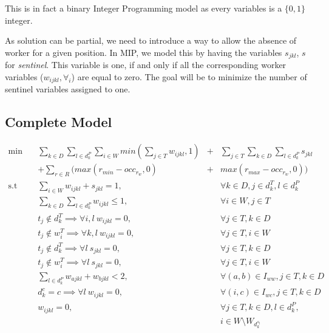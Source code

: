 \documentclass[../../thesis.tex]{subfiles}
\begin{document}
This is in fact a binary Integer Programming model as every variables is a $\{0, 1\}$ integer.

As solution can be partial, we need to introduce a way to allow the absence of worker for a 
given position. In MIP, we model this by having the variables $s_{jkl}$, $s$ for \emph{sentinel}. This variable is one, if and only if all the 
corresponding worker variables ($w_{ijkl}, \forall_i$) are equal to zero. The goal will be to minimize 
the number of sentinel variables assigned to one.

\subsection{Complete Model}

\begingroup
\allowdisplaybreaks
\begin{align}
    \textrm{min} \quad & \sum_{k \in D} \sum_{l \in d^P_k} \sum_{i \in W} min(\sum_{j \in T} w_{ijkl}, 1) &+&  \sum_{j \in T}\sum_{k\in D}\sum_{l \in d^P_k} s_{jkl} \nonumber \\
    & + \sum_{r \in R} \big( max(r_{min} - occ_{r_{w}}, 0) &+&   max(r_{max} - occ_{r_{w}}, 0) \big)  \label{obj} \\
    \textrm{s.t} \quad & \sum_{i \in W} w_{ijkl} + s_{jkl} = 1, && \forall k \in D, j \in d_k^T, l \in d_k^P \label{wc1} \\
    & \sum_{k \in D} \sum_{l \in d_k^P} w_{ijkl} \leq 1, && \forall i \in W, j \in T \label{wc2} \\
    & t_j \notin d^T_{k} \implies \forall i, l \ w_{ijkl} = 0,  && \forall j \in T , k \in D \label{wc3} \\
    & t_j \notin w^T_{i} \implies \forall k, l \ w_{ijkl} = 0, && \forall j \in T, i \in W \label{wc4} \\ 
    & t_j \notin d^T_{k} \implies \forall l \ s_{jkl} = 0,  && \forall j \in T , k \in D \label{sc1} \\
    & t_j \notin w^T_{i} \implies \forall l \ s_{jkl} = 0, && \forall j \in T, i \in W \label{sc2} \\ 
    & \sum_{l \in d^P_k} w_{ajkl} + w_{bjkl} < 2, &&  \forall {(a, b) \in I_{ww}}, j \in T, k \in D \label{wc5} \\
    & d^c_{k} = c \implies \forall l \ w_{ijkl} = 0, && \forall {(i, c) \in I_{wc}}, j \in T, k \in D \label{wc6} \\ 
    & w_{ijkl} = 0, && \forall j \in T, k \in D, l \in d^P_k, \nonumber \\
    & && i \in W \setminus W_{d^{s_l}_k} \label{wc7} \\

\end{align}
\end{document}
